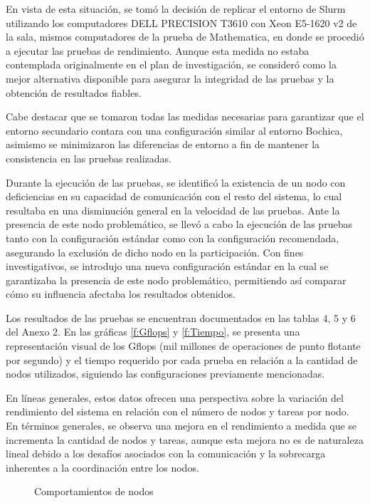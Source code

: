 \begin{spacing}{1.5}
En vista de esta situación, se tomó la decisión de replicar el entorno de Slurm utilizando los computadores DELL PRECISION T3610 con Xeon E5-1620 v2 de la sala, mismos computadores de la prueba de Mathematica, en donde se procedió a ejecutar las pruebas de rendimiento. Aunque esta medida no estaba contemplada originalmente en el plan de investigación, se consideró como la mejor alternativa disponible para asegurar la integridad de las pruebas y la obtención de resultados fiables.

Cabe destacar que se tomaron todas las medidas necesarias para garantizar que el entorno secundario contara con una configuración similar al entorno Bochica, asimismo se minimizaron las diferencias de entorno a fin de mantener la consistencia en las pruebas realizadas.

Durante la ejecución de las pruebas, se identificó la existencia de un nodo con deficiencias en su capacidad de comunicación con el resto del sistema, lo cual resultaba en una disminución general en la velocidad de las pruebas. Ante la presencia de este nodo problemático, se llevó a cabo la ejecución de las pruebas tanto con la configuración estándar como con la configuración recomendada, asegurando la exclusión de dicho nodo en la participación. Con fines investigativos, se introdujo una nueva configuración estándar en la cual se garantizaba la presencia de este nodo problemático, permitiendo así comparar cómo su influencia afectaba los resultados obtenidos.

Los resultados de las pruebas se encuentran documentados en las tablas 4, 5 y 6 del Anexo 2. En las gráficas \ref{f:Gflops} y \ref{f:Tiempo}, se presenta una representación visual de los Gflops (mil millones de operaciones de punto flotante por segundo) y el tiempo requerido por cada prueba en relación a la cantidad de nodos utilizados, siguiendo las configuraciones previamente mencionadas.

En líneas generales, estos datos ofrecen una perspectiva sobre la variación del rendimiento del sistema en relación con el número de nodos y tareas por nodo. En términos generales, se observa una mejora en el rendimiento a medida que se incrementa la cantidad de nodos y tareas, aunque esta mejora no es de naturaleza lineal debido a los desafíos asociados con la comunicación y la sobrecarga inherentes a la coordinación entre los nodos.

\begin{figure}
 \centering
 \caption{Comportamientos de nodos}
 \label{f:nodos}
\end{figure}


\end{spacing}
